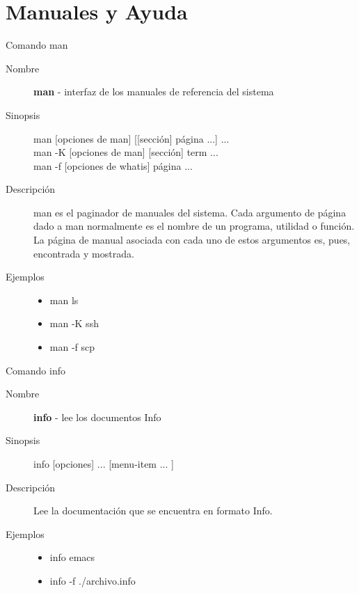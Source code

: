 \section{Manuales y Ayuda}

\begin{frame}[c]{Comando man}
  \begin{description}
    \item[Nombre]
      \textbf{man} - interfaz de los manuales de referencia del sistema

    \vspace{\baselineskip}
    \item[Sinopsis]
      man [opciones de man] [[sección] página ...] ... \\
      man -K [opciones de man] [sección] term ... \\
      man -f [opciones de whatis] página ... \\

    \vspace{\baselineskip}
    \item[Descripción]
      man es el paginador de manuales del sistema.
      Cada argumento de página dado a man normalmente es el nombre de un
      programa, utilidad o función. La página de manual asociada con cada
      uno de estos argumentos es, pues, encontrada y mostrada.

    \vspace{\baselineskip}
    \item[Ejemplos]
      \begin{itemize}
        \item man ls
        \item man -K ssh
        \item man -f scp
      \end{itemize}
  \end{description}
\end{frame}

\begin{frame}[c]{Comando info}
  \begin{description}
    \item[Nombre]
      \textbf{info} - lee los documentos Info

    \vspace{\baselineskip}
    \item[Sinopsis]
      info [opciones] ... [menu-item ... ]

    \vspace{\baselineskip}
    \item[Descripción]
      Lee la documentación que se encuentra en formato Info.

    \vspace{\baselineskip}
    \item[Ejemplos]
      \begin{itemize}
        \item info emacs
        \item info -f ./archivo.info
      \end{itemize}
  \end{description}
\end{frame}

